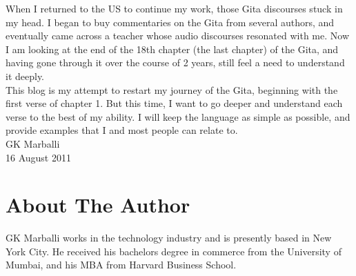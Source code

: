 \documentclass[a5paper,9pt,openany]{memoir}
\begin{document}
When I returned to the US to continue my work, those Gita discourses stuck in my head. I began to buy commentaries on the Gita from several authors, and eventually came across a teacher whose audio discourses resonated with me. Now I am looking at the end of the 18th chapter (the last chapter) of the Gita, and having gone through it over the course of 2 years, still feel a need to understand it deeply.~\\

This blog is my attempt to restart my journey of the Gita, beginning with the first verse of chapter 1. But this time, I want to go deeper and understand each verse to the best of my ability. I will keep the language as simple as possible, and provide examples that I and most people can relate to.~\\

GK Marballi\\
16 August 2011

\chapter*{About The Author}

GK Marballi works in the technology industry and is presently based in New York City. He received his bachelors degree in commerce from the University of Mumbai, and his MBA from Harvard Business School.\\
\end{document}

